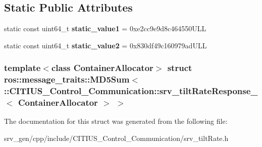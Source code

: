 \subsection*{\-Static \-Public \-Attributes}
\begin{DoxyCompactItemize}
\item 
\hypertarget{structros_1_1message__traits_1_1_m_d5_sum_3_01_1_1_c_i_t_i_u_s___control___communication_1_1srv_7236414a409ea97f3aefceaf59d7e3b5_abdc9b459e7cbb8fee8f80fea9817918d}{static const uint64\-\_\-t {\bfseries static\-\_\-value1} = 0xe2cc9e9d8c464550\-U\-L\-L}\label{structros_1_1message__traits_1_1_m_d5_sum_3_01_1_1_c_i_t_i_u_s___control___communication_1_1srv_7236414a409ea97f3aefceaf59d7e3b5_abdc9b459e7cbb8fee8f80fea9817918d}

\item 
\hypertarget{structros_1_1message__traits_1_1_m_d5_sum_3_01_1_1_c_i_t_i_u_s___control___communication_1_1srv_7236414a409ea97f3aefceaf59d7e3b5_aaa513389d6a4544f796ad2d6dd969162}{static const uint64\-\_\-t {\bfseries static\-\_\-value2} = 0x830df49c160979ad\-U\-L\-L}\label{structros_1_1message__traits_1_1_m_d5_sum_3_01_1_1_c_i_t_i_u_s___control___communication_1_1srv_7236414a409ea97f3aefceaf59d7e3b5_aaa513389d6a4544f796ad2d6dd969162}

\end{DoxyCompactItemize}
\subsubsection*{template$<$class Container\-Allocator$>$ struct ros\-::message\-\_\-traits\-::\-M\-D5\-Sum$<$ \-::\-C\-I\-T\-I\-U\-S\-\_\-\-Control\-\_\-\-Communication\-::srv\-\_\-tilt\-Rate\-Response\-\_\-$<$ Container\-Allocator $>$ $>$}



\-The documentation for this struct was generated from the following file\-:\begin{DoxyCompactItemize}
\item 
srv\-\_\-gen/cpp/include/\-C\-I\-T\-I\-U\-S\-\_\-\-Control\-\_\-\-Communication/srv\-\_\-tilt\-Rate.\-h\end{DoxyCompactItemize}
